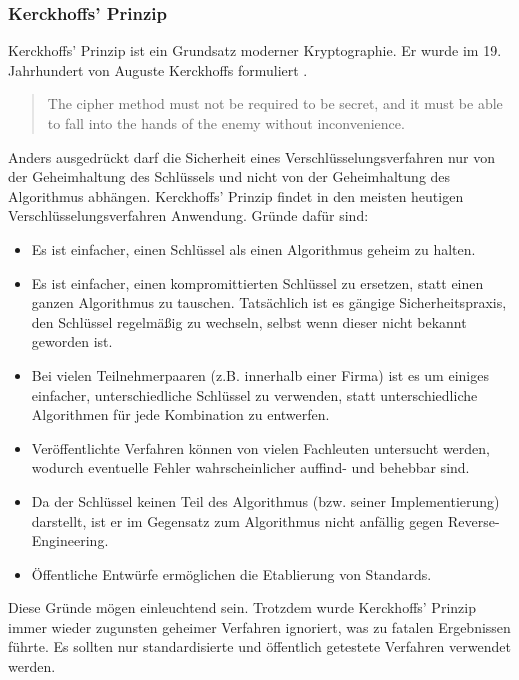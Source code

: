 \subsubsection{Kerckhoffs' Prinzip}

Kerckhoffs' Prinzip ist ein Grundsatz moderner Kryptographie. Er wurde im 19. Jahrhundert von Auguste Kerckhoffs formuliert \cite{Kerckhoffs}.
\begin{quote}
	\grqq{}The cipher method must not be required to be secret, and it must be able to fall into the hands of the enemy without inconvenience.\grqq
\end{quote}
Anders ausgedrückt darf die Sicherheit eines Verschlüsselungsverfahren nur von der Geheimhaltung des Schlüssels und nicht von der Geheimhaltung des Algorithmus abhängen.
Kerckhoffs' Prinzip findet in den meisten heutigen Verschlüsselungsverfahren Anwendung. Gründe dafür sind:
\begin{itemize}
\item Es ist einfacher, einen Schlüssel als einen Algorithmus geheim zu halten.
\item Es ist einfacher, einen kompromittierten Schlüssel zu ersetzen, statt einen ganzen Algorithmus zu tauschen. Tatsächlich ist es gängige Sicherheitspraxis, den Schlüssel regelmäßig zu wechseln, selbst wenn dieser nicht bekannt geworden ist.
\item Bei vielen Teilnehmerpaaren (z.B. innerhalb einer Firma) ist es um einiges einfacher, unterschiedliche Schlüssel zu verwenden, statt unterschiedliche Algorithmen für jede Kombination zu entwerfen.
\item Veröffentlichte Verfahren können von vielen Fachleuten untersucht werden, wodurch eventuelle Fehler wahrscheinlicher auffind- und behebbar sind.
\item Da der Schlüssel keinen Teil des Algorithmus (bzw. seiner Implementierung) darstellt, ist er im Gegensatz zum Algorithmus nicht anfällig gegen Reverse-Engineering.
\item Öffentliche Entwürfe ermöglichen die Etablierung von Standards.
\end{itemize}
Diese Gründe mögen einleuchtend sein. Trotzdem wurde Kerckhoffs' Prinzip immer wieder zugunsten geheimer Verfahren ignoriert, was zu fatalen Ergebnissen führte. Es sollten nur standardisierte und öffentlich getestete Verfahren verwendet werden.